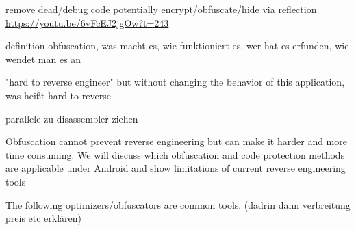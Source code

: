remove dead/debug code\newline
potentially encrypt/obfuscate/hide via reflection\newline
\url{https://youtu.be/6vFcEJ2jgOw?t=243}\newline

definition obfuscation, was macht es, wie funktioniert es, wer hat es erfunden, wie wendet man es an\newline

"hard to reverse engineer" but without changing the behavior of this
application, was heißt hard to reverse\newline

parallele zu disassembler ziehen\newline

Obfuscation cannot prevent reverse engineering but can make it harder and more time consuming. We will discuss which obfuscation and code protection methods are applicable under Android and show limitations of current reverse engineering tools\newline

The following optimizers/obfuscators are common tools. (dadrin dann verbreitung preis etc erklären)
